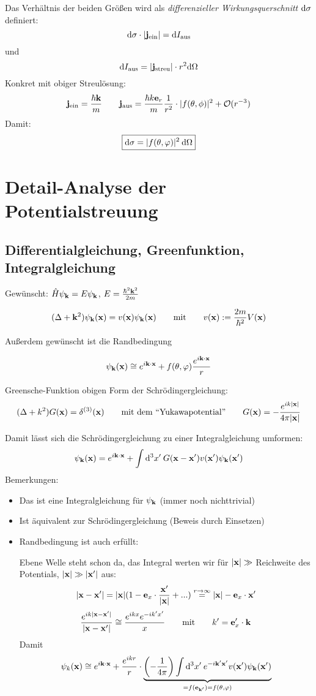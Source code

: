 \documentclass[11pt,a4paper]{report}
\begin{document}
Das Verhältnis der beiden Größen wird als \textit{differenzieller Wirkungsquerschnitt} $\mathrm{d}\sigma$ definiert:
$$\mathrm{d}\sigma\cdot |\mathbf{j}_\text{ein}| = \mathrm{d} I_\text{aus}$$
und
$$\mathrm{d} I_\text{aus} = |\mathbf{j}_\text{streu}|\cdot r^2\mathrm{d}\Omega$$
Konkret mit obiger Streulösung:
$$\mathbf{j}_\text{ein} = \frac{\hbar\mathbf{k}}{m}\qquad \mathbf{j}_\text{aus} = \frac{\hbar k \mathbf{e}_r}{m}\frac{1}{r^2}\cdot |f(\theta ,\phi )|^2 + \mathcal{O}(r^{-3})$$
Damit:
$$\boxed{\mathrm{d}\sigma = |f(\theta ,\varphi )|^2\:\mathrm{d}\Omega}$$

\section{Detail-Analyse der Potentialstreuung}

\subsection{Differentialgleichung, Greenfunktion, Integralgleichung}

Gewünscht: $\hat{H}\psi_{\mathbf{k}} = E\psi_{\mathbf{k}}$, $E=\frac{\hbar^2\mathbf{k}^2}{2m}$

$$(\Delta +\mathbf{k}^2)\psi_{\mathbf{k}} (\mathbf{x} ) = v(\mathbf{x} )\psi_{\mathbf{k}} (\mathbf{x} )\qquad \text{mit}\qquad v(\mathbf{x} ):=\frac{2m}{\hbar^2}V(\mathbf{x} )$$

Außerdem gewünscht ist die Randbedingung

$$\psi_{\mathbf{k}} (\mathbf{x} ) \cong e^{i\mathbf{k}\cdot\mathbf{x} }+f(\theta ,\varphi )\frac{e^{i\mathbf{k}\cdot\mathbf{x}}}{r}$$

Greensche-Funktion obigen Form der Schrödingergleichung:
$$(\Delta +k^2)G(\mathbf{x} )=\delta^{(3)}(\mathbf{x} )\qquad\text{mit dem ``Yukawapotential''}\qquad G(\mathbf{x} )=-\frac{e^{ik|\mathbf{x} |}}{4\pi |\mathbf{x} |}$$

Damit lässt sich die Schrödingergleichung zu einer Integralgleichung umformen:
$$\psi_{\mathbf{k}} (\mathbf{x} )=e^{i\mathbf{k}\cdot\mathbf{x}}+\int\mathrm{d}^3x'\: G(\mathbf{x} - \mathbf{x} ')v(\mathbf{x} ')\psi_{\mathbf{k}} (\mathbf{x} ')$$
Bemerkungen:
\begin{itemize}
\item Das ist eine Integralgleichung für $\psi_{\mathbf{k}}$ (immer noch nichttrivial)
\item Ist äquivalent zur Schrödingergleichung (Beweis durch Einsetzen)
\item Randbedingung ist auch erfüllt:\par 
Ebene Welle steht schon da, das Integral werten wir für $|\mathbf{x} |\gg$ Reichweite des Potentials, $|\mathbf{x} |\gg |\mathbf{x} '|$ aus:
$$|\mathbf{x} - \mathbf{x} '| = |\mathbf{x} |(1 - \mathbf{e}_x\cdot\frac{\mathbf{x} '}{|\mathbf{x} |}+...) \overset{r\rightarrow\infty}{=} |\mathbf{x}|-\mathbf{e}_x\cdot\mathbf{x} '$$
$$\frac{e^{ik|\mathbf{x}-\mathbf{x}'|}}{|\mathbf{x} -\mathbf{x}'|}\cong \frac{e^{ikx}e^{-ik'x'}}{x}\qquad\text{mit}\qquad k'=\mathbf{e}_x'\cdot \mathbf{k}$$
Damit
$$\psi_k (\mathbf{x} ) \cong e^{i\mathbf{k}\cdot\mathbf{x}} + \frac{e^{ikr}}{r}\cdot\underbrace{\left(-\frac{1}{4\pi}\right)\int\mathrm{d}^3x'\:e^{-i\mathbf{k}'\mathbf{x}'}v(\mathbf{x} ')\psi_{\mathbf{k}} (\mathbf{x} ')}_{=f(\mathbf{e}_{\mathbf{k}'})=f(\theta ,\varphi )}$$
\end{itemize}
\end{document}
